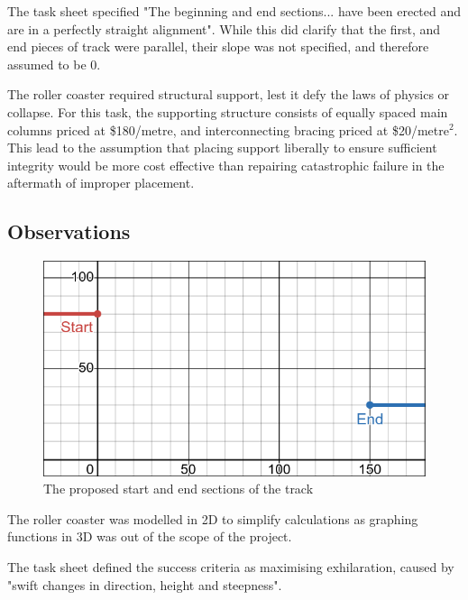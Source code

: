 \documentclass[11pt, letterpaper]{article}
\begin{document}
The task sheet specified "The beginning and end sections... have been erected and are in a perfectly straight alignment". While this did clarify that the first, and end pieces of track were parallel, their slope was not specified, and therefore assumed to be 0.

The roller coaster required structural support, lest it defy the laws of physics or collapse. For this task, the supporting structure consists of equally spaced main columns priced at \$180/metre, and interconnecting bracing priced at \$20/metre$^2$. This lead to the assumption that placing support liberally to ensure sufficient integrity would be more cost effective than repairing catastrophic failure in the aftermath of improper placement.





\subsection{Observations}
		\begin{figure}[h]
	
	\begin{center}
		\includegraphics[width=15cm]{Start and End.png}
		
		\caption{The proposed start and end sections of the track}
	\end{center}
	
	
\end{figure}



The roller coaster was modelled in 2D to simplify calculations as graphing functions in 3D was out of the scope of the project. 

The task sheet defined the success criteria as maximising exhilaration, caused by "swift changes in direction, height and steepness". 
		
\end{document}
